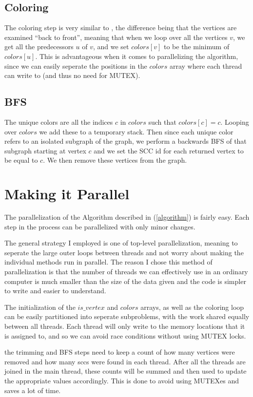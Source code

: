 \documentclass[10pt, a4paper]{article}
\begin{document}
\subsection{Coloring} \label{coloring}
The coloring step is very similar to \cite{slota2014}, the difference being that the vertices are 
examined ``back to front'', meaning that when we loop over all the vertices $v$, we get all the predecessors $u$
of $v$, and we set $colors[v]$ to be the minimum of $colors[u]$. This is advantageous when it comes to 
parallelizing the algorithm, since we can easily seperate the positions in the $colors$ array where each 
thread can write to (and thus no need for MUTEX).

\subsection{BFS} \label{bfs}
The unique colors are all the indices $c$ in $colors$ such that $colors[c] = c$. Looping over $colors$ we
add these to a temporary stack. Then since each unique color refers to an isolated subgraph of the graph, 
we perform a backwards BFS of that subgraph starting at vertex $c$ and we set the SCC id for each returned
vertex to be equal to $c$. We then remove these vertices from the graph.

\section{Making it Parallel}
The parallelization of the Algorithm described in (\ref{algorithm}) is fairly easy. Each step in the process
can be parallelized with only minor changes. 

The general strategy I employed is one of top-level parallelization, meaning to seperate the large
outer loops between threads and not worry about making the individual methods run in parallel. The reason
I chose this method of parallelization is that the number of threads we can effectively use in an ordinary 
computer is much smaller than the size of the data given and the code is simpler to write and easier to 
understand.

The initialization of the $is\_vertex$ and $colors$ arrays, as well as the coloring loop can be easily 
partitioned into seperate subproblems, with the work shared equally between all threads. Each thread will 
only write to the memory locations that it is assigned to, and so we can avoid race conditions without using
MUTEX locks. 

the trimming and BFS steps need to keep a count of how many vertices were removed and how many sccs were found
in each thread. After all the threads are joined in the main thread, these counts will be summed and then 
used to update the appropriate values accordingly. This is done to avoid using MUTEXes and saves a lot of time.
\end{document}
